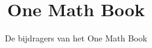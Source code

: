 \documentclass[11pt,a4paper,twoside,openany]{book}
\title{One Math Book}
\author{De bijdragers van het One Math Book}
\date{\bookdate}
\begin{document}
\frontmatter



\tableofcontents

\mainmatter





\appendix
\part{\omsolutionspart}




\backmatter
\printindex
\end{document}
